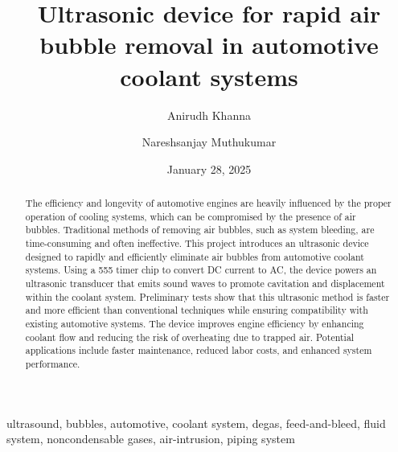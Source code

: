 ﻿\documentclass[12pt,conference,onecolumn]{IEEEtran}
\title{Ultrasonic device for rapid air bubble removal in automotive coolant systems}
\author{Anirudh Khanna \and Nareshsanjay Muthukumar}
\date{January 28, 2025}
\newcommand{\keywords}{ultrasound, bubbles, automotive, coolant system, degas, feed-and-bleed, fluid system, noncondensable gases, air-intrusion, piping system}
\begin{document}
\maketitle 

\begin{abstract}
The efficiency and longevity of automotive engines are heavily influenced by the proper operation of cooling systems, which can be compromised by the presence of air bubbles. Traditional methods of removing air bubbles, such as system bleeding, are time-consuming and often ineffective. This project introduces an ultrasonic device designed to rapidly and efficiently eliminate air bubbles from automotive coolant systems. Using a 555 timer chip to convert DC current to AC, the device powers an ultrasonic transducer that emits sound waves to promote cavitation and displacement within the coolant system. Preliminary tests show that this ultrasonic method is faster and more efficient than conventional techniques while ensuring compatibility with existing automotive systems. The device improves engine efficiency by enhancing coolant flow and reducing the risk of overheating due to trapped air. Potential applications include faster maintenance, reduced labor costs, and enhanced system performance.
\end{abstract}

\begin{IEEEkeywords}
\keywords
\end{IEEEkeywords}
\end{document}
